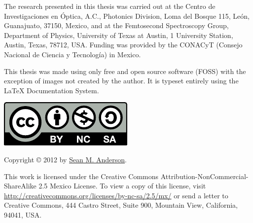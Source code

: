 \null
\vfill
\begin{flushleft}
The research presented in this thesis was carried out at the Centro de
Investigaciones en \'Optica, A.C., Photonics Division, Loma del Bosque 115,
Le\'on, Guanajuato, 37150, Mexico, and at the Femtosecond Spectroscopy Group,
Department of Physics, University of Texas at Austin, 1 University Station,
Austin, Texas, 78712, USA. Funding was provided by the CONACyT (Consejo Nacional
de Ciencia y Tecnolog\'ia) in Mexico.

This thesis was made using only free and open source software (FOSS) with the
exception of images not created by the author. It is typeset entirely using the
\LaTeX{} Documentation System.
\vspace{1cm}

{\href{http://creativecommons.org/licenses/by-nc-sa/2.5/mx/}
{\includegraphics[scale=0.6]{figures/by-nc-sa}}}

Copyright {\sffamily\copyright{}} 2012 by 
\href{mailto:sean.martin.anderson@gmail.com}{Sean M. Anderson}.

This work is licensed under the Creative Commons
Attribution-NonCommercial-ShareAlike 2.5 Mexico License. To view a copy of this
license, visit \url{http://creativecommons.org/licenses/by-nc-sa/2.5/mx/} or
send a letter to Creative Commons, 444 Castro Street, Suite 900, Mountain View,
California, 94041, USA.
\end{flushleft}
\clearpage

